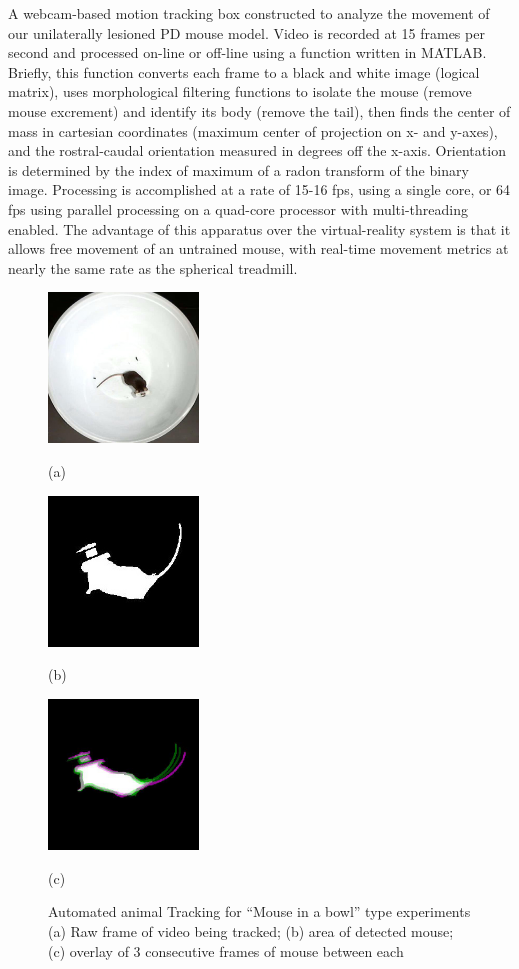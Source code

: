 A webcam-based motion tracking box constructed to analyze the movement of our unilaterally lesioned PD mouse model.
Video is recorded at 15 frames per second and processed on-line or off-line using a function written in MATLAB.
Briefly, this function converts each frame to a black and white image (logical matrix), uses morphological filtering functions to isolate the mouse (remove mouse excrement) and identify its body (remove the tail), then finds the center of mass in cartesian coordinates (maximum center of projection on x- and y-axes), and the rostral-caudal orientation measured in degrees off the x-axis.
Orientation is determined by the index of maximum of a radon transform of the binary image.
Processing is accomplished at a rate of 15-16 fps, using a single core, or 64 fps using parallel processing on a quad-core processor with multi-threading enabled.
The advantage of this apparatus over the virtual-reality system is that it allows free movement of an untrained mouse, with real-time movement metrics at nearly the same rate as the spherical treadmill.

\begin{figure}[htb]
	\begin{minipage}[t]{0.32\linewidth}\centering
		\includegraphics[width=4cm]{01raw.jpg}
		\centerline{(a)}
	\end{minipage}
	\hfill
	\begin{minipage}[t]{0.32\linewidth}\centering
		\includegraphics[width=4cm]{02black-and-white.jpg}
		\centerline{(b)}
	\end{minipage}
	\begin{minipage}[t]{0.32\linewidth}\centering
		\includegraphics[width=4cm]{03twoframes.jpg}
		\centerline{(c)}
	\end{minipage}
	\caption{
		Automated animal Tracking for ``Mouse in a bowl'' type experiments (a) Raw frame of video being tracked;
		(b) area of detected mouse; (c) overlay of 3 consecutive frames of mouse between each}
	\label{fig:Sampling}
\end{figure}

